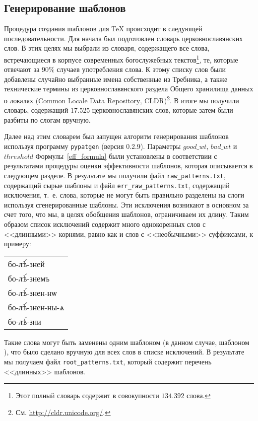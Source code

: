 \documentclass[12pt,a4paper,oneside]{extarticle}
\begin{document}
\subsection{Генерирование шаблонов}

Процедура создания шаблонов для \TeX{} происходит в следующей последовательности. Для начала был подготовлен словарь церковнославянских слов. В этих целях мы выбрали из словаря, содержащего все слова, встречающиеся в корпусе современных богослужебных текстов\footnote{Этот полный словарь содержит в совокупности $134.392$ слова.}, те, которые отвечают за 90\% случаев употребления слова. К этому списку слов были добавлены случайно выбранные имена собственные из Требника, а также технические термины из церковнославянского раздела Общего хранилища данных о локалях (\textenglish{Common Locale Data Repository}, CLDR)\footnote{См. \url{http://cldr.unicode.org/}.}. В итоге мы получили словарь, содержащий $17.525$ церковнославянских слов, которые затем были разбиты по слогам вручную.

Далее над этим словарем был запущен алгоритм генерирования шаблонов используя программу \verb+pypatgen+ (версия 0.2.9). Параметры $good\_wt$, $bad\_wt$ и $threshold$ Формулы~\ref{eff_formula} были установлены в соответствии с результатами процедуры оценки эффективности шаблонов, которая описывается в следующем разделе. В результате мы получили файл \verb+raw_patterns.txt+, содержащий сырые шаблоны и файл \verb+err_raw_patterns.txt+, содержащий исключения, т.~е. слова, которые не могут быть правильно разделены на слоги используя сгенерированные шаблоны. Эти исключения возникают в основном за счет того, что мы, в целях обобщения шаблонов, ограничиваем их длину. Таким образом список исключений содержит много однокоренных слов с <<длинными>> корнями, равно как и слов с <<необычными>> суффиксами, к примеру:

\begin{center}
\begin{churchslavonic}
\begin{tabular}{l}
бо-лѣ́-зней \\
бо-лѣ́-знемъ \\
бо-лѣ́-знен-нѡ \\
бо-лѣ́-знен-ны-ѧ \\
бо-лѣ́-зни \\
\end{tabular}
\end{churchslavonic}
\end{center}

\noindent Такие слова могут быть заменены одним шаблоном (в данном случае, шаблоном ), что было сделано вручную для всех слов в списке исключений. В результате мы получаем файл \verb+root_patterns.txt+, который содержит перечень <<длинных>> шаблонов.
\end{document}
